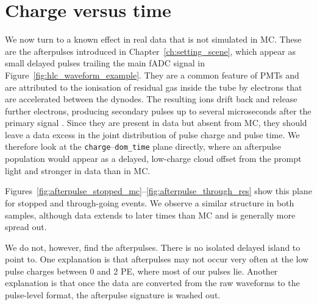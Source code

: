 \section{Charge versus time}
\label{sec:charge_time}


We now turn to a known effect in real data that is not simulated in MC. These are the afterpulses introduced in Chapter~\ref{ch:setting_scene}, which appear as small delayed pulses trailing the main fADC signal in Figure~\ref{fig:hlc_waveform_example}. They are a common feature of PMTs and are attributed to the ionisation of residual gas inside the tube by electrons that are accelerated between the dynodes. The resulting ions drift back and release further electrons, producing secondary pulses up to several microseconds after the primary signal \cite{IceCube2017}. Since they are present in data but absent from MC, they should
leave a data excess in the joint distribution of pulse charge and pulse time. We therefore
look at the \texttt{charge}--\texttt{dom\_time} plane directly, where an
afterpulse population would appear as a delayed, low-charge cloud offset
from the prompt light and stronger in data than in MC.

Figures~\ref{fig:afterpulse_stopped_mc}--\ref{fig:afterpulse_through_res}
show this plane for stopped and through-going events. We observe a similar structure in both samples, although data extends to later times than MC and is generally more spread out.

We do not, however, find the afterpulses. There is no isolated delayed island to point to. One explanation is that afterpulses may not occur very often at the low pulse charges between 0 and 2 PE, where most of our pulses lie. Another explanation is that once the data are converted from the raw waveforms to the pulse-level format, the afterpulse signature is washed out.


